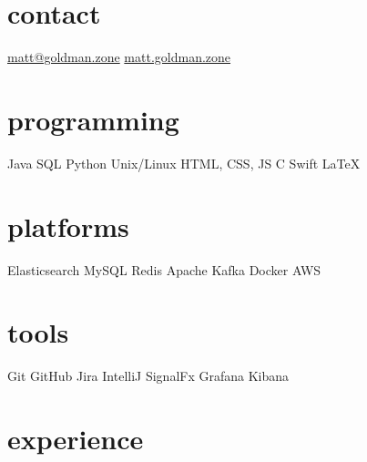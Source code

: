 \documentclass[]{friggeri-mlg-cv} %
\begin{document}


\begin{aside} %
\section{contact}
\href{mailto:matt@goldman.zone}{matt@goldman.zone}
\href{http://matt.goldman.zone}{matt.goldman.zone}
\section{programming}
Java
SQL
Python
Unix/Linux
HTML, CSS, JS
C
Swift
\LaTeX
\section{platforms}
Elasticsearch
MySQL
Redis
Apache Kafka
Docker
AWS
\section{tools}
Git
GitHub
Jira
IntelliJ
SignalFx
Grafana
Kibana
\end{aside}



\section{experience}
\end{document}

